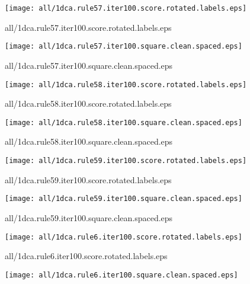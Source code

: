 \documentclass{article}
\begin{document}
\begin{center}
\begin{minipage}{\textwidth}
\texttt{[image: all/1dca.rule57.iter100.score.rotated.labels.eps]}
\end{minipage}
\end{center}
{\footnotesize all/1dca.rule57.iter100.score.rotated.labels.eps}
\begin{center}
\begin{minipage}{\textwidth}
\texttt{[image: all/1dca.rule57.iter100.square.clean.spaced.eps]}
\end{minipage}
\end{center}
{\footnotesize all/1dca.rule57.iter100.square.clean.spaced.eps}
\begin{center}
\begin{minipage}{\textwidth}
\texttt{[image: all/1dca.rule58.iter100.score.rotated.labels.eps]}
\end{minipage}
\end{center}
{\footnotesize all/1dca.rule58.iter100.score.rotated.labels.eps}
\begin{center}
\begin{minipage}{\textwidth}
\texttt{[image: all/1dca.rule58.iter100.square.clean.spaced.eps]}
\end{minipage}
\end{center}
{\footnotesize all/1dca.rule58.iter100.square.clean.spaced.eps}
\begin{center}
\begin{minipage}{\textwidth}
\texttt{[image: all/1dca.rule59.iter100.score.rotated.labels.eps]}
\end{minipage}
\end{center}
{\footnotesize all/1dca.rule59.iter100.score.rotated.labels.eps}
\begin{center}
\begin{minipage}{\textwidth}
\texttt{[image: all/1dca.rule59.iter100.square.clean.spaced.eps]}
\end{minipage}
\end{center}
{\footnotesize all/1dca.rule59.iter100.square.clean.spaced.eps}
\begin{center}
\begin{minipage}{\textwidth}
\texttt{[image: all/1dca.rule6.iter100.score.rotated.labels.eps]}
\end{minipage}
\end{center}
{\footnotesize all/1dca.rule6.iter100.score.rotated.labels.eps}
\begin{center}
\begin{minipage}{\textwidth}
\texttt{[image: all/1dca.rule6.iter100.square.clean.spaced.eps]}
\end{minipage}
\end{center}
\end{document}
